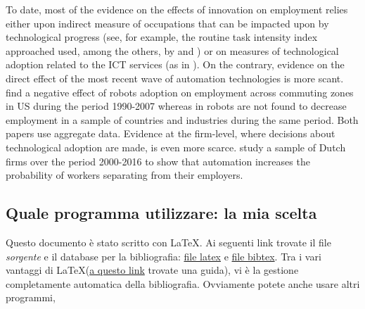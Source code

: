 \documentclass[12pt]{article}
\begin{document}
To date, most of the evidence on the effects of innovation on
employment relies either upon indirect measure of occupations that can
be impacted upon by technological progress (see, for example, the
routine task intensity index approached used, among the others, by
\citealp{autor_etal_2013_AER} and \citealp{goos_etal_2014}) or on
measures of technological adoption related to the ICT services (as in
\citealp{harrigan_etal_2016_NBER}).  On the contrary, evidence on the
direct effect of the most recent wave of automation technologies is
more scant.  \cite{acemoglu_restrepo_2017} find a negative effect of
robots adoption on employment across commuting zones in US during the
period 1990-2007 whereas in \cite{graetz_michaels_2018} robots are not
found to decrease employment in a sample of countries and industries
during the same period.  Both papers use aggregate data. Evidence at
the firm-level, where decisions about technological adoption are made,
is even more scarce.  \cite{bessen_2019} study a sample of Dutch firms
over the period 2000-2016 to show that automation increases the
probability of workers separating from their employers.


\bigskip
\subsection*{Quale programma utilizzare: la mia scelta}
Questo documento \`e stato scritto con \LaTeX. Ai seguenti link
trovate il file \textit{sorgente} e il database per la bibliografia:
\href{http://mgrazzi.github.io/guida-tesi.tex}{file latex} e
\href{http://mgrazzi.github.io/bib_file_esempio.bib}{file bibtex}. Tra
i vari vantaggi di \LaTeX (\href{https://tobi.oetiker.ch/lshort/lshort.pdf}{a questo link}
trovate una guida), vi \`e la gestione completamente automatica della
bibliografia. Ovviamente potete anche usare altri programmi,



\end{document}
